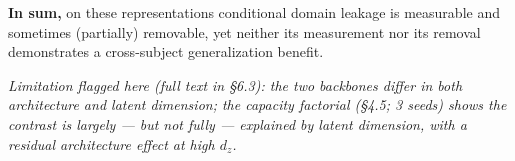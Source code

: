 \textbf{In sum,} on these representations conditional domain leakage is measurable and sometimes (partially) removable, yet neither its measurement nor its removal demonstrates a cross-subject generalization benefit.

\emph{Limitation flagged here (full text in \S6.3): the two backbones differ in both architecture and latent
dimension; the capacity factorial (\S4.5; 3 seeds) shows the contrast is largely --- but not fully ---
explained by latent dimension, with a residual architecture effect at high $d_z$.}

